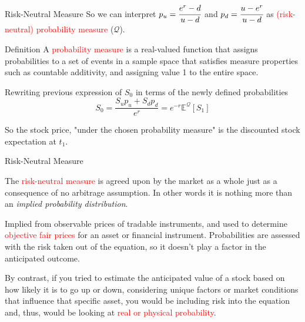 \documentclass{beamer}
\begin{document}
\begin{frame}{Risk-Neutral Measure}
  So we can interpret $p_u=\cfrac{e^r -d}{u-d}$ and $p_d=\cfrac{u - e^r}{u-d}$ as \textcolor{red}{(risk-neutral) probability measure} ($\mathcal{Q}$).\vspace{0.3cm}
  
\pause
\begin{block}{Definition}
	A \textcolor{red}{probability measure} is a real-valued function that assigns probabilities to a set of events in a sample space that satisfies measure properties such as countable additivity, and assigning value 1 to the entire space.
\end{block}	
\pause
Rewriting previous expression of $S_0$ in terms of the newly defined probabilities
\begin{equation}
S_0 = \frac{S_up_u + S_dp_d}{e^r} = e^{-r}\mathbb{E}^\mathcal{Q}[S_1]
\label{eq:risk_neutral_price}
\end{equation}

So the stock price, "under the chosen probability measure" is the discounted stock expectation at $t_1$.
\end{frame}

\begin{frame}{Risk-Neutral Measure}

The \textcolor{red}{risk-neutral measure} is agreed upon by the market as a whole just as a consequence of no arbitrage assumption.
In other words it is nothing more than an \emph{implied probability distribution}.
\pause

Implied from observable prices of tradable instruments, and used to determine \textcolor{red}{objective fair prices} for an asset or financial instrument. Probabilities are assessed with the risk taken out of the equation, so it doesn’t play a factor in the anticipated outcome.
\pause

By contrast, if you tried to estimate the anticipated value of a stock based on how likely it is to go up or down, considering unique factors or market conditions that influence that specific asset, you would be including risk into the equation and, thus, would be looking at \textcolor{red}{real or physical probability}.
\end{frame}
\end{document}

